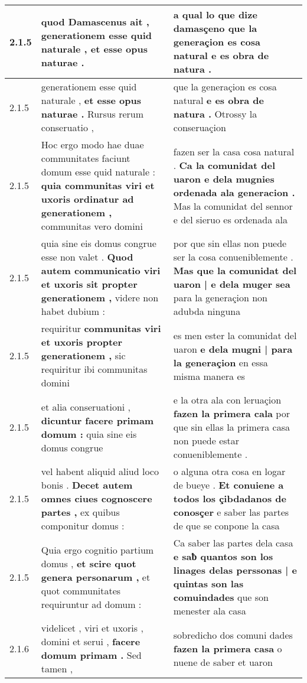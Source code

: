 \begin{tabular}{|p{1cm}|p{6.5cm}|p{6.5cm}|}
2.1.5 & quod Damascenus ait , \textbf{ generationem esse quid naturale , } et esse opus naturae . & a qual lo que dize damasçeno \textbf{ que la generaçion es cosa natural } e es obra de natura . \\\hline
2.1.5 & generationem esse quid naturale , \textbf{ et esse opus naturae . } Rursus rerum conseruatio , & que la generaçion es cosa natural \textbf{ e es obra de natura . } Otrossy la conseruaçion \\\hline
2.1.5 & Hoc ergo modo hae duae communitates faciunt domum esse quid naturale : \textbf{ quia communitas viri et uxoris ordinatur ad generationem , } communitas vero domini & fazen ser la casa cosa natural . \textbf{ Ca la comunidat del uaron e dela mugnies ordenada ala generacion . } Mas la comunidat del sennor e del sieruo es ordenada ala \\\hline
2.1.5 & quia sine eis domus congrue esse non valet . \textbf{ Quod autem communicatio viri et uxoris sit propter generationem , } videre non habet dubium : & por que sin ellas non puede ser la cosa conueniblemente . \textbf{ Mas que la comunidat del uaron | e dela muger sea } para la generaçion non adubda ninguna \\\hline
2.1.5 & requiritur \textbf{ communitas viri et uxoris propter generationem , } sic requiritur ibi communitas domini & es men ester la comunidat del uaron \textbf{ e dela mugni | para la generaçion } en essa misma manera es \\\hline
2.1.5 & et alia conseruationi , \textbf{ dicuntur facere primam domum : } quia sine eis domus congrue & e la otra ala con leruaçion \textbf{ fazen la primera cala } por que sin ellas la primera casa non puede estar conueniblemente . \\\hline
2.1.5 & vel habent aliquid aliud loco bonis . \textbf{ Decet autem omnes ciues cognoscere partes , } ex quibus componitur domus : & o alguna otra cosa en logar de bueye . \textbf{ Et conuiene a todos los çibdadanos de conosçer } e saber las partes de que se conpone la casa \\\hline
2.1.5 & Quia ergo cognitio partium domus , \textbf{ et scire quot genera personarum , } et quot communitates requiruntur ad domum : & Ca saber las partes dela casa \textbf{ e saƀ quantos son los linages delas perssonas | e quintas son las comuindades } que son menester ala casa \\\hline
2.1.6 & videlicet , viri et uxoris , domini et serui , \textbf{ facere domum primam . } Sed tamen , & sobredicho dos comuni dades \textbf{ fazen la primera casa } o nuene de saber et uaron \\\hline

\end{tabular}

